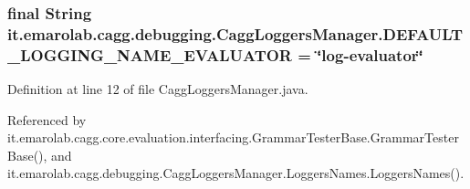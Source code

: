 \hypertarget{classit_1_1emarolab_1_1cagg_1_1debugging_1_1CaggLoggersManager_af8668f66339e9fdbd8cbca1d1852b907}{
\subsubsection[{D\-E\-F\-A\-U\-L\-T\-\_\-\-L\-O\-G\-G\-I\-N\-G\-\_\-\-N\-A\-M\-E\-\_\-\-E\-V\-A\-L\-U\-A\-T\-O\-R}]{\setlength{\rightskip}{0pt plus 5cm}final String it.\-emarolab.\-cagg.\-debugging.\-Cagg\-Loggers\-Manager.\-D\-E\-F\-A\-U\-L\-T\-\_\-\-L\-O\-G\-G\-I\-N\-G\-\_\-\-N\-A\-M\-E\-\_\-\-E\-V\-A\-L\-U\-A\-T\-O\-R = \char`\"{}log-\/evaluator\char`\"{}\hspace{0.3cm}{\ttfamily [static]}}}\label{classit_1_1emarolab_1_1cagg_1_1debugging_1_1CaggLoggersManager_af8668f66339e9fdbd8cbca1d1852b907}


Definition at line 12 of file Cagg\-Loggers\-Manager.\-java.



Referenced by it.\-emarolab.\-cagg.\-core.\-evaluation.\-interfacing.\-Grammar\-Tester\-Base.\-Grammar\-Tester\-Base(), and it.\-emarolab.\-cagg.\-debugging.\-Cagg\-Loggers\-Manager.\-Loggers\-Names.\-Loggers\-Names().

